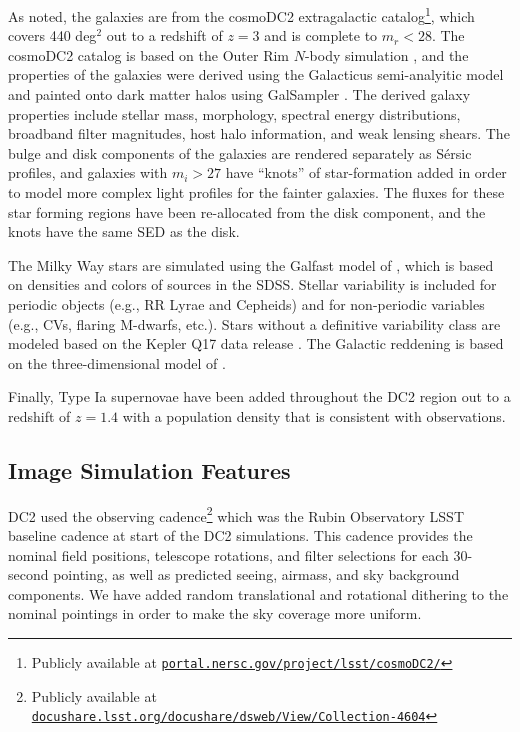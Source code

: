 \documentclass[modern]{descnote}
\newcommand*{\https}[1]{\href{https://#1}{\nolinkurl{#1}}}
\begin{document}
As noted, the galaxies are from the cosmoDC2 extragalactic catalog\footnote{Publicly available at \https{portal.nersc.gov/project/lsst/cosmoDC2/}}, which covers 440 deg$^2$ out to a redshift of $z = 3$ and is complete to $m_r <28$.  The cosmoDC2 catalog is based on the Outer Rim $N$-body simulation \citep{2019ApJS..245...16H}, and the properties of the galaxies were derived using the Galacticus semi-analyitic model \citep{benson_2010b} and painted onto dark matter halos using GalSampler \citep{2020MNRAS.495.5040H}.  The derived galaxy properties include stellar mass, morphology, spectral energy distributions, broadband filter magnitudes, host halo information, and weak lensing shears.   The bulge and disk components of the galaxies are rendered separately as S\'ersic profiles, and galaxies with $m_i > 27$ have ``knots'' of star-formation added in order to model more complex light profiles for the fainter galaxies. The fluxes for these star forming regions have been re-allocated from the disk component, and the knots have the same SED as the disk.

The Milky Way stars are simulated using the Galfast model of \citet{2008ApJ...673..864J}, which is based on densities and colors of sources in the SDSS. Stellar variability is included for periodic objects (e.g., RR Lyrae and Cepheids) and for non-periodic variables (e.g., CVs, flaring M-dwarfs, etc.).  Stars without a definitive variability class are modeled based on the Kepler Q17 data release \citep{2016ksci.rept....3T}.  The Galactic reddening is based on the three-dimensional model of \cite{2005AJ....130..659A}.

Finally, Type Ia supernovae have been added throughout the DC2 region out to a redshift of $z=1.4$ with a population density that is consistent with observations.

\subsection{Image Simulation Features}

DC2 used the  observing cadence\footnote{Publicly available at \https{docushare.lsst.org/docushare/dsweb/View/Collection-4604}} which was the Rubin Observatory LSST baseline cadence at start of the DC2 simulations. This cadence provides the nominal field positions, telescope rotations, and filter selections for each 30-second pointing, as well as predicted seeing, airmass, and sky background components.  We have added random translational and rotational dithering to the nominal pointings in order to make the sky coverage more uniform.
\end{document}
